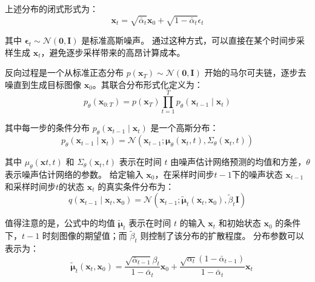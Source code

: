 上述分布的闭式形式为：
\begin{equation}
    \label{eq:x0_xt}
    \mathbf{x}_t=\sqrt{\bar{\alpha}_t} \mathbf{x}_0+\sqrt{1-\bar{\alpha}_t} \epsilon_t
\end{equation}

其中 $\boldsymbol{\epsilon}_t \sim \mathcal{N}(\mathbf{0}, \mathbf{I})$ 是标准高斯噪声。
通过这种方式，可以直接在某个时间步采样生成 $\mathbf{x}_t$，避免逐步采样带来的高昂计算成本。


反向过程是一个从标准正态分布 $p\left(\mathbf{x}_T\right) \sim \mathcal{N}(\mathbf{0}, \mathbf{I})$ 开始的马尔可夫链，逐步去噪直到生成目标图像 $\mathbf{x}_0$。其联合分布形式化定义为：
\begin{equation}
\label{eq:p_total}
    p_\theta\left(\mathbf{x}_{0: T}\right) =p\left(\mathbf{x}_T\right) \prod_{t=1}^T p_\theta\left(\mathbf{x}_{t-1} \mid \mathbf{x}_t\right)
\end{equation}

其中每一步的条件分布 $p_\theta(\mathbf{x}_{t-1} \mid \mathbf{x}_t)$ 是一个高斯分布：
\begin{equation}
\label{eq:p}
    p_\theta\left(\mathbf{x}_{t-1} \mid \mathbf{x}_t\right) =\mathcal{N}\left(\mathbf{x}_{t-1} ; \boldsymbol{\mu}_\theta\left(\mathbf{x}_t, t\right), \Sigma_\theta\left(\mathbf{x}_t, t\right)\right) 
\end{equation}

其中 $\mu_\theta\left(\mathbf{x}t, t\right)$ 和 $\Sigma_\theta\left(\mathbf{x}_t, t\right)$ 表示在时间 $t$ 由噪声估计网络预测的均值和方差，$\theta$ 表示噪声估计网络的参数。
给定输入 $\mathbf{x}_0$，在采样时间步$t-1$下的噪声状态 $\mathbf{x}_{t-1}$ 和采样时间步$t$的状态 $\mathbf{x}_t$ 的真实条件分布为：
\begin{equation}
    \label{eq:real_q}
    q\left(\mathbf{x}_{t-1} \mid \mathbf{x}_t, \mathbf{x}_0\right)=\mathcal{N}\left(\mathbf{x}_{t-1} ; \tilde{\boldsymbol{\mu}}_t\left(\mathbf{x}_t, \mathbf{x}_0\right), \tilde{\beta}_t \mathbf{I}\right) 
\end{equation}


值得注意的是，公式中的均值 $\tilde{\boldsymbol{\mu}}_t$ 表示在时间 $t$ 的输入 $\mathbf{x}_t$ 和初始状态 $\mathbf{x}_0$ 的条件下，$t-1$ 时刻图像的期望值；而 $\tilde{\beta}_t$ 则控制了该分布的扩散程度。
分布参数可以表示为：
\begin{equation}
    \quad\tilde{\boldsymbol{\mu}}_t\left(\mathbf{x}_t, \mathbf{x}_0\right)=\frac{\sqrt{\bar{\alpha}_{t-1}} \beta_t}{1-\bar{\alpha}_t} \mathbf{x}_0+\frac{\sqrt{\alpha_t}\left(1-\bar{\alpha}_{t-1}\right)}{1-\bar{\alpha}_t} \mathbf{x}_t
\end{equation}


